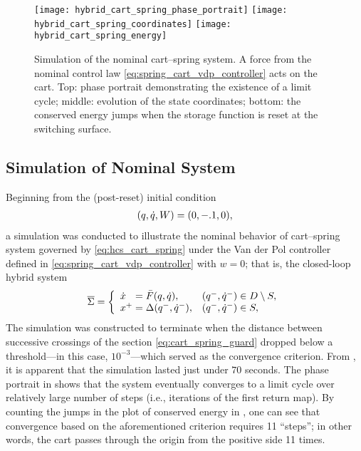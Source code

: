 \begin{figure*}[htp!]
  \centering
  \texttt{[image: hybrid\_cart\_spring\_phase\_portrait]}
  \texttt{[image: hybrid\_cart\_spring\_coordinates]}
  \texttt{[image: hybrid\_cart\_spring\_energy]}
  \caption[Simulation of the nominal cart--spring system.]{Simulation of the
    nominal cart--spring system.
    A force from the nominal control law \eqref{eq:spring_cart_vdp_controller}
    acts on the cart.
    Top: phase portrait demonstrating the existence of a limit cycle;
    middle: evolution of the state coordinates;
    bottom: the conserved energy jumps when the storage function is reset at the
    switching surface.}
  \label{fig:cart_spring_simulation_nominal}
\end{figure*}


\subsection{Simulation of Nominal System}
Beginning from the (post-reset) initial condition
\begin{align*}
  (q, \dot{q}, W) = (0, -.1, 0),
\end{align*}
a simulation was conducted to illustrate the nominal behavior of cart--spring
system governed by \eqref{eq:hcs_cart_spring} under the Van der Pol controller
defined in \eqref{eq:spring_cart_vdp_controller} with $w = 0$;
%
that is, the closed-loop hybrid system
\begin{align}
  \label{eq:hs_cart_spring_nominal}
  {\overline {\Sigma}} = \left\{
    \begin{array}{l l}
      {\dot {x}}\hphantom{^+} = {\bar {F}}(q, \dot{q}), & (q^{-}, \dot{q}^{-}) \in D \setminus S,\\
      x^{+} = \Delta(q^{-}, \dot{q}^{-}), & (q^{-}, \dot{q}^{-}) \in S,
    \end{array}\right.
\end{align}
%
The simulation was constructed to terminate when the distance between successive
crossings of the \Poincare{} section \eqref{eq:cart_spring_guard} dropped below
a threshold---in this case, $10^{-3}$---which served as the convergence
criterion.
%
From , it is apparent that the
simulation lasted just under $70$ seconds.
%
The phase portrait in  shows that the
system eventually converges to a limit cycle over relatively large number of
steps (i.e., iterations of the \Poincare{} first return map).
By counting the jumps in the plot of conserved energy in
, one can see that convergence based
on the aforementioned criterion requires 11 ``steps'';
%
in other words, the cart passes through the origin from the positive side 11
times.

